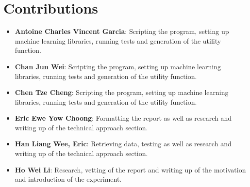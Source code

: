 \documentclass{article}
\begin{document}
	\section{Contributions}
	\begin{itemize}
		\item \textbf{Antoine Charles Vincent Garcia}: 
		Scripting the program, setting up machine learning libraries, running tests and generation of the utility function.
		\item \textbf{Chan Jun Wei}: 
		Scripting the program, setting up machine learning libraries, running tests and generation of the utility function.
		\item \textbf{Chen Tze Cheng}: 
		Scripting the program, setting up machine learning libraries, running tests and generation of the utility function.
		\item \textbf{Eric Ewe Yow Choong}: 
		Formatting the report as well as research and writing up of the technical approach section.
		\item \textbf{Han Liang Wee, Eric}: 
		Retrieving data, testing as well as research and writing up of the technical approach section.
		\item \textbf{Ho Wei Li}: 
		Research, vetting of the report and writing up of the motivation and introduction of the experiment. \\
	\end{itemize}
	
	
	{\scriptsize }
\end{document}
